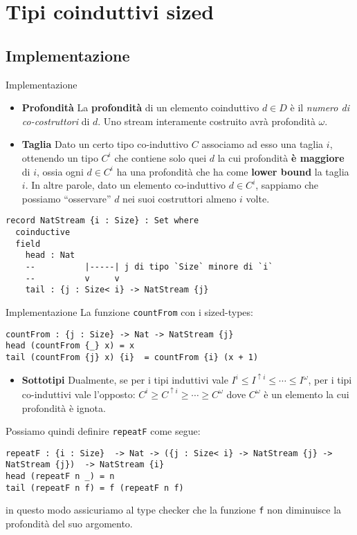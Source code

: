 \documentclass[t,aspectratio=169,9pt]{beamer}
\begin{document}
\section[coinduttivi sized]{Tipi coinduttivi sized}
\subsection{Implementazione}
\begin{frame}[fragile]{Implementazione}
	\begin{itemize}
		\item{{\bf Profondità}
		            La \textbf{profondità} di un elemento coinduttivo $d \in D$ è il
		            \textit{numero di co-costruttori} di $d$. Uno stream interamente
		            costruito avrà profondità $\omega$.
		      }
		\item{{\bf Taglia}
		Dato un certo tipo co-induttivo $C$ associamo ad esso una taglia $i$,
		ottenendo un tipo $C^i$ che contiene solo quei $d$ la cui profondità {\bf
		è maggiore} di $i$, ossia ogni $d \in C^i$ ha una profondità che ha come
			{\bf lower bound} la taglia $i$. In altre parole, dato un elemento
		co-induttivo $d \in C^{i}$, sappiamo che possiamo ``osservare'' $d$ nei
		suoi costruttori almeno $i$ volte.
		}
	\end{itemize}

	\begin{verbatim}
record NatStream {i : Size} : Set where 
  coinductive
  field 
    head : Nat 
    --          |-----| j di tipo `Size` minore di `i`
    --          v     v
    tail : {j : Size< i} -> NatStream {j}
  \end{verbatim}
\end{frame}
\begin{frame}[fragile]{Implementazione}
	La funzione \texttt{countFrom} con i sized-types:
	\begin{verbatim}
countFrom : {j : Size} -> Nat -> NatStream {j}
head (countFrom {_} x) = x
tail (countFrom {j} x) {i}  = countFrom {i} (x + 1)
\end{verbatim}
	\begin{itemize}
		\item{{\bf Sottotipi}
		            Dualmente, se per i tipi induttivi vale $I^i \leq
			            I^{\uparrow i} \leq \cdots \leq I^{\omega}$, per i
		            tipi co-induttivi vale l'opposto: $C^i \geq
			            C^{\uparrow i} \geq \cdots \geq C^{\omega}$ dove
		            $C^{\omega}$ è un elemento la cui profondità è
		            ignota.
		      }
	\end{itemize}

	Possiamo quindi definire \texttt{repeatF} come segue:
	\begin{verbatim}
repeatF : {i : Size}  -> Nat -> ({j : Size< i} -> NatStream {j} -> NatStream {j})  -> NatStream {i}
head (repeatF n _) = n 
tail (repeatF n f) = f (repeatF n f)
\end{verbatim}
	in questo modo assicuriamo al type checker che la funzione \texttt{f} non
	diminuisce la profondità del suo argomento.
\end{frame}
\end{document}
